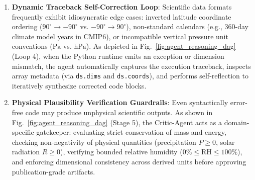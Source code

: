 \begin{enumerate}
\begin{itemize}
    \end{itemize}
    \item \textbf{Dynamic Traceback Self-Correction Loop}: Scientific data formats frequently exhibit idiosyncratic edge cases: inverted latitude coordinate ordering ($90^\circ \to -90^\circ$ vs. $-90^\circ \to 90^\circ$), non-standard calendars (e.g., 360-day climate model years in CMIP6), or incompatible vertical pressure unit conventions ($\text{Pa}$ vs. $\text{hPa}$). As depicted in Fig.~\ref{fig:agent_reasoning_dag} (Loop 4), when the Python runtime emits an exception or dimension mismatch, the agent automatically captures the execution traceback, inspects array metadata (via \texttt{ds.dims} and \texttt{ds.coords}), and performs self-reflection to iteratively synthesize corrected code blocks.
    \item \textbf{Physical Plausibility Verification Guardrails}: Even syntactically error-free code may produce unphysical scientific outputs. As shown in Fig.~\ref{fig:agent_reasoning_dag} (Stage 5), the Critic-Agent acts as a domain-specific gatekeeper: evaluating strict conservation of mass and energy, checking non-negativity of physical quantities (precipitation $P \ge 0$, solar radiation $R \ge 0$), verifying bounded relative humidity ($0\% \le \text{RH} \le 100\%$), and enforcing dimensional consistency across derived units before approving publication-grade artifacts.
\end{enumerate}

